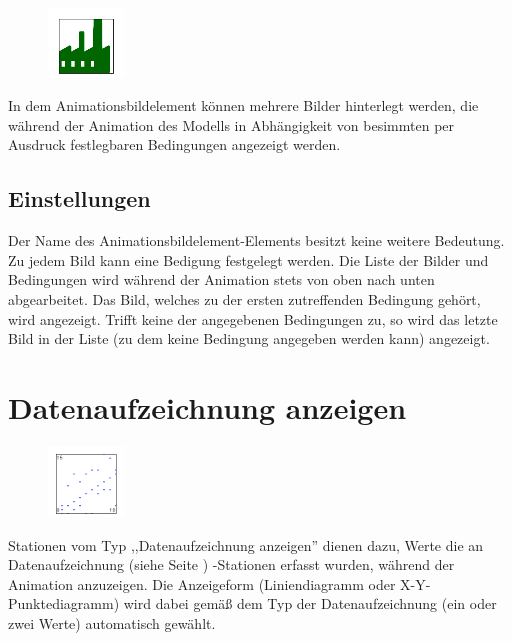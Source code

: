 \begin{figure}
\vspace{-22pt}
\includegraphics[width=2cm]{imageModelElementAnimationImage.png}
\vspace{-22pt}
\end{figure}

In dem Animationsbildelement können mehrere Bilder hinterlegt werden, die während der
Animation des Modells in Abhängigkeit von besimmten per Ausdruck festlegbaren
Bedingungen angezeigt werden.

\subsection*{Einstellungen}

Der Name des Animationsbildelement-Elements besitzt keine weitere Bedeutung. 
Zu jedem Bild kann eine Bedigung festgelegt werden. Die Liste der Bilder und
Bedingungen wird während der Animation stets von oben nach unten abgearbeitet.
Das Bild, welches zu der ersten zutreffenden Bedingung gehört, wird angezeigt.
Trifft keine der angegebenen Bedingungen zu, so wird das letzte Bild in der
Liste (zu dem keine Bedingung angegeben werden kann) angezeigt.


\section{Datenaufzeichnung anzeigen}
\label{ref:ModelElementAnimationRecord}

\begin{figure}
\vspace{-22pt}
\includegraphics[width=2cm]{imageModelElementAnimationRecord.png}
\vspace{-22pt}
\end{figure}

Stationen vom Typ ,,Datenaufzeichnung anzeigen'' dienen dazu, Werte die an
Datenaufzeichnung (siehe Seite \pageref{ref:ModelElementRecord}) -Stationen erfasst
wurden, während der Animation anzuzeigen. Die Anzeigeform (Liniendiagramm oder
X-Y-Punktediagramm) wird dabei gemäß dem Typ der Datenaufzeichnung (ein oder zwei Werte)
automatisch gewählt.

